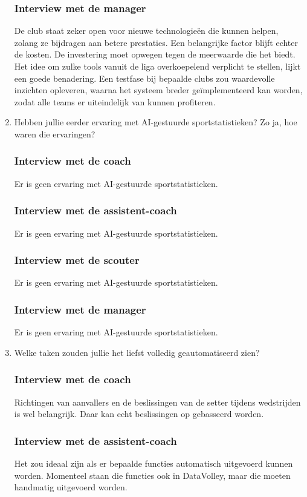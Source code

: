 \begin{enumerate}
  \subsubsection{Interview met de manager}
  De club staat zeker open voor nieuwe technologieën die kunnen helpen, zolang ze bijdragen aan betere prestaties. Een belangrijke factor blijft echter de kosten. De investering moet opwegen tegen de meerwaarde die het biedt. Het idee om zulke tools vanuit de liga overkoepelend verplicht te stellen, lijkt een goede benadering. Een testfase bij bepaalde clubs zou waardevolle inzichten opleveren, waarna het systeem breder geïmplementeerd kan worden, zodat alle teams er uiteindelijk van kunnen profiteren.
  \item Hebben jullie eerder ervaring met AI-gestuurde sportstatistieken? Zo ja, hoe waren die ervaringen?
  \subsubsection{Interview met de coach}
  Er is geen ervaring met AI-gestuurde sportstatistieken.
  \subsubsection{Interview met de assistent-coach}
  Er is geen ervaring met AI-gestuurde sportstatistieken.
  \subsubsection{Interview met de scouter}
  Er is geen ervaring met AI-gestuurde sportstatistieken.
  \subsubsection{Interview met de manager}
  Er is geen ervaring met AI-gestuurde sportstatistieken.
  \item Welke taken zouden jullie het liefst volledig geautomatiseerd zien?
  \subsubsection{Interview met de coach}
  Richtingen van aanvallers en de beslissingen van de setter tijdens wedstrijden is wel belangrijk. Daar kan echt beslissingen op gebasseerd worden. 
  \subsubsection{Interview met de assistent-coach}
  Het zou ideaal zijn als er bepaalde functies automatisch uitgevoerd kunnen worden. Momenteel staan die functies ook in DataVolley, maar die moeten handmatig uitgevoerd worden.

\end{enumerate}
